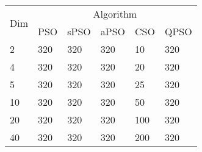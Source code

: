 \begin{tabular}{|l|l|l|l|l|l|}
\toprule
\multirow{2}{*}{Dim} & \multicolumn{5}{c|}{Algorithm}             \\ \cmidrule{2-6}
                     & PSO    & sPSO   & aPSO   & CSO    & QPSO   \\ \midrule
2                    & 320 & 320 & 320 & 10  & 320 \\ \midrule
4                    & 320 & 320 & 320 & 20  & 320 \\ \midrule
5                    & 320 & 320 & 320 & 25  & 320 \\ \midrule
10                   & 320 & 320 & 320 & 50  & 320 \\ \midrule
20                   & 320 & 320 & 320 & 100 & 320 \\ \midrule
40                   & 320 & 320 & 320 & 200 & 320 \\
\bottomrule
\end{tabular}